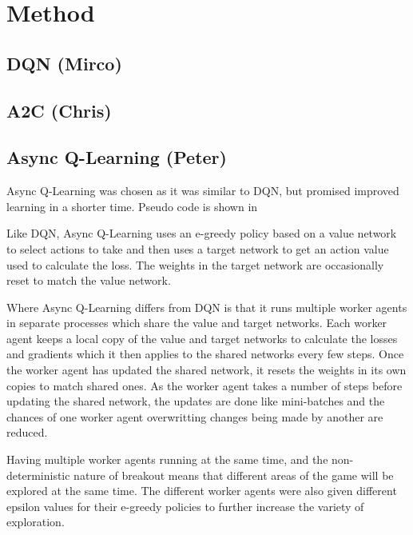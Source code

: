 \documentclass{article}
\begin{document}
\section{Method}
\subsection{DQN (Mirco)}

\subsection{A2C (Chris)}

\subsection{Async Q-Learning (Peter)}

Async Q-Learning was chosen as it was similar to DQN, but promised improved learning in a shorter time.
Pseudo code is shown in 

Like DQN, Async Q-Learning uses an e-greedy policy based on a value network to select actions to take and then uses a target network to get an action value used to calculate the loss.
The weights in the target network are occasionally reset to match the value network.

Where Async Q-Learning differs from DQN is that it runs multiple worker agents in separate processes which share the value and target networks.
Each worker agent keeps a local copy of the value and target networks to calculate the losses and gradients which it then applies to the shared networks every few steps.
Once the worker agent has updated the shared network, it resets the weights in its own copies to match shared ones.
As the worker agent takes a number of steps before updating the shared network, the updates are done like mini-batches and the chances of one worker agent overwritting changes being made by another are reduced.

Having multiple worker agents running at the same time, and the non-deterministic nature of breakout means that different areas of the game will be explored at the same time.
The different worker agents were also given different epsilon values for their e-greedy policies to further increase the variety of exploration.
\end{document}
